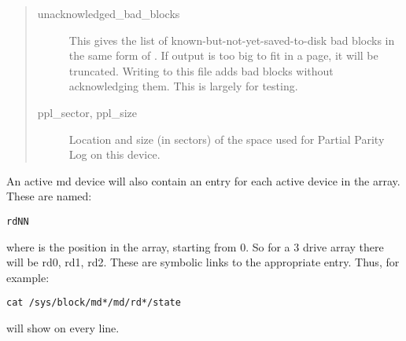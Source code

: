 \documentclass[a4paper,8pt,english]{sphinxmanual}
\begin{document}
\begin{quote}
\begin{description}
\item[{unacknowledged\_bad\_blocks}] \leavevmode
This gives the list of known-but-not-yet-saved-to-disk bad
blocks in the same form of . If output is too big
to fit in a page, it will be truncated. Writing to this file
adds bad blocks without acknowledging them. This is largely
for testing.

\item[{ppl\_sector, ppl\_size}] \leavevmode
Location and size (in sectors) of the space used for Partial Parity Log
on this device.

\end{description}
\end{quote}

An active md device will also contain an entry for each active device
in the array.  These are named:

\begin{Verbatim}[commandchars=\\\{\}]
rdNN
\end{Verbatim}

where  is the position in the array, starting from 0.
So for a 3 drive array there will be rd0, rd1, rd2.
These are symbolic links to the appropriate  entry.
Thus, for example:

\begin{Verbatim}[commandchars=\\\{\}]
cat /sys/block/md*/md/rd*/state
\end{Verbatim}

will show  on every line.
\end{document}
